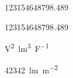 \documentclass[12pt,ngerman]{scrartcl}
\begin{document}
\num{123154648798,489}

\num{123154648798.489}

\unit{\square\volt\cubic\lumen\per\farad}

\SI{42342}{\lumen\per\square\meter}
\end{document}
